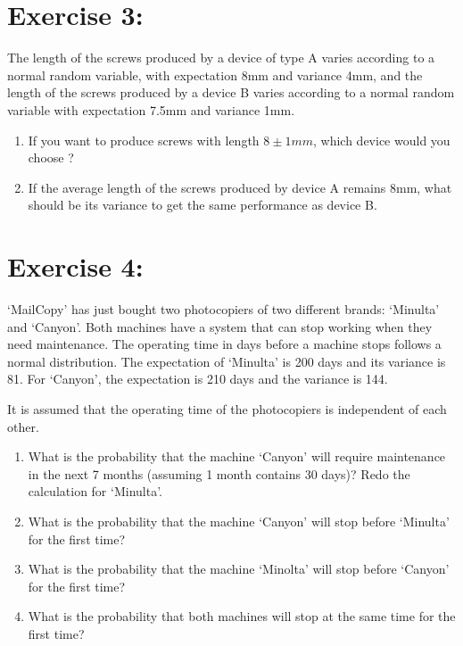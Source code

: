 \documentclass[12pt,thmsa]{article}
\begin{document}
\section*{Exercise 3:}
The length of the screws produced by a device of type A varies according to a normal random variable, with expectation 8mm and variance 4mm, and the length of the screws produced by a device B varies according to
a normal random variable with expectation 7.5mm and variance 1mm.
\begin{enumerate}
  \item If you want to produce screws with length $8\pm 1mm$, which device would you choose ?
  \item If the average length of the screws produced by device A remains 8mm, what should be its variance to get the
  same performance as device B.
\end{enumerate}




\section*{Exercise 4:}

`MailCopy' has just bought two photocopiers of two different brands: `Minulta' and `Canyon'. Both machines have a system that can stop working when they need maintenance. The operating time in days before a machine stops follows a normal distribution. The expectation of `Minulta' is 200 days and its variance is 81. For `Canyon', the expectation is 210 days and the variance is 144.

\medskip

\noindent It is assumed that the operating time of the
photocopiers is independent of each other.
\begin{enumerate}%
\item What is the probability that the machine `Canyon' will require maintenance in the next 7 months (assuming 1 month contains 30 days)? Redo the calculation for `Minulta'.
\item What is the probability that the machine `Canyon' will stop before `Minulta' for the first time?
\item What is the probability that the machine `Minolta' will stop before `Canyon' for the first time?
\item What is the probability that both machines will stop at the same time for the first time?
\end{enumerate}
\end{document}
